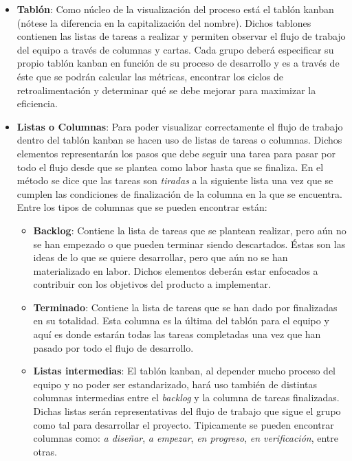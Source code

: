 \begin{itemize}
    \item \textbf{Tablón}: %
    Como núcleo de la visualización del proceso está el tablón kanban (nótese la
    diferencia en la capitalización del nombre). Dichos tablones contienen las
    listas de tareas a realizar y permiten observar el flujo de trabajo del
    equipo a través de columnas y cartas. Cada grupo deberá especificar su
    propio tablón kanban en función de su proceso de desarrollo y es a través de
    éste que se podrán calcular las métricas, encontrar los ciclos de
    retroalimentación y determinar qué se debe mejorar para maximizar la
    eficiencia.

    \item \textbf{Listas o Columnas}:
    Para poder visualizar correctamente el flujo de trabajo dentro del tablón
    kanban se hacen uso de listas de tareas o columnas. Dichos elementos
    representarán los pasos que debe seguir una tarea para pasar por todo el
    flujo desde que se plantea como labor hasta que se finaliza. En el método se
    dice que las tareas son \emph{tiradas} a la siguiente lista una vez que se
    cumplen las condiciones de finalización de la columna en la que se
    encuentra. Entre los tipos de columnas que se pueden encontrar están:
    \begin{itemize}
        \item \textbf{Backlog}: Contiene la lista de tareas que se plantean
        realizar, pero aún no se han empezado o que pueden terminar siendo
        descartados. Éstas son las ideas de lo que se quiere desarrollar, pero
        que aún no se han materializado en labor. Dichos elementos deberán estar
        enfocados a contribuir con los objetivos del producto a implementar.
        \item \textbf{Terminado}: Contiene la lista de tareas que se han dado
        por finalizadas en su totalidad. Esta columna es la última del tablón
        para el equipo y aquí es donde estarán todas las tareas completadas una
        vez que han pasado por todo el flujo de desarrollo.
        \item \textbf{Listas intermedias}: El tablón kanban, al depender mucho
        proceso del equipo y no poder ser estandarizado, hará uso también de
        distintas columnas intermedias entre el \emph{backlog} y la columna de
        tareas finalizadas. Dichas listas serán representativas del flujo de
        trabajo que sigue el grupo como tal para desarrollar el proyecto.
        Tipicamente se pueden encontrar columnas como: \emph{a diseñar}, \emph{a
        empezar}, \emph{en progreso}, \emph{en verificación}, entre otras.
    \end{itemize}


\end{itemize}
